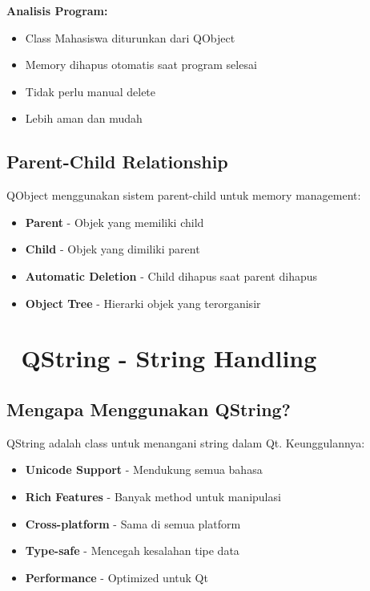 \textbf{Analisis Program:}
\begin{itemize}
\item Class Mahasiswa diturunkan dari QObject
\item Memory dihapus otomatis saat program selesai
\item Tidak perlu manual delete
\item Lebih aman dan mudah
\end{itemize}

\subsection{Parent-Child Relationship}

QObject menggunakan sistem parent-child untuk memory management:

\begin{itemize}
\item \textbf{Parent} - Objek yang memiliki child
\item \textbf{Child} - Objek yang dimiliki parent
\item \textbf{Automatic Deletion} - Child dihapus saat parent dihapus
\item \textbf{Object Tree} - Hierarki objek yang terorganisir
\end{itemize}

\section{📝 QString - String Handling}

\subsection{Mengapa Menggunakan QString?}

QString adalah class untuk menangani string dalam Qt. Keunggulannya:

\begin{itemize}
\item \textbf{Unicode Support} - Mendukung semua bahasa
\item \textbf{Rich Features} - Banyak method untuk manipulasi
\item \textbf{Cross-platform} - Sama di semua platform
\item \textbf{Type-safe} - Mencegah kesalahan tipe data
\item \textbf{Performance} - Optimized untuk Qt
\end{itemize}

